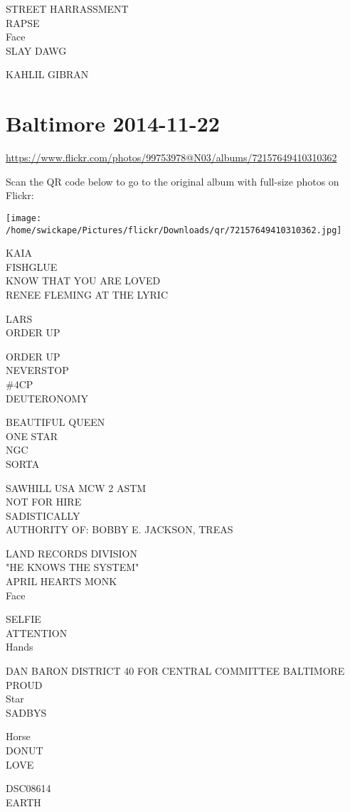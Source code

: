 \documentclass[10pt,letterpaper]{article}
\begin{document}
STREET HARRASSMENT\\
RAPSE\\
Face\\
SLAY DAWG

KAHLIL GIBRAN


\section*{Baltimore 2014-11-22}

\url{https://www.flickr.com/photos/99753978@N03/albums/72157649410310362}

Scan the QR code below to go to the original album with full-size photos on Flickr:

\texttt{[image: /home/swickape/Pictures/flickr/Downloads/qr/72157649410310362.jpg]}


KAIA\\
FISHGLUE\\
KNOW THAT YOU ARE LOVED\\
RENEE FLEMING AT THE LYRIC

LARS\\
ORDER UP

ORDER UP\\
NEVERSTOP\\
\#4CP\\
DEUTERONOMY

BEAUTIFUL QUEEN\\
ONE STAR\\
NGC\\
SORTA

SAWHILL USA MCW 2 ASTM\\
NOT FOR HIRE\\
SADISTICALLY\\
AUTHORITY OF: BOBBY E. JACKSON, TREAS

LAND RECORDS DIVISION\\
"HE KNOWS THE SYSTEM"\\
APRIL HEARTS MONK\\
Face

SELFIE\\
ATTENTION\\
Hands

DAN BARON DISTRICT 40 FOR CENTRAL COMMITTEE BALTIMORE PROUD\\
Star\\
SADBYS

Horse\\
DONUT\\
LOVE

DSC08614\\
EARTH
\end{document}
